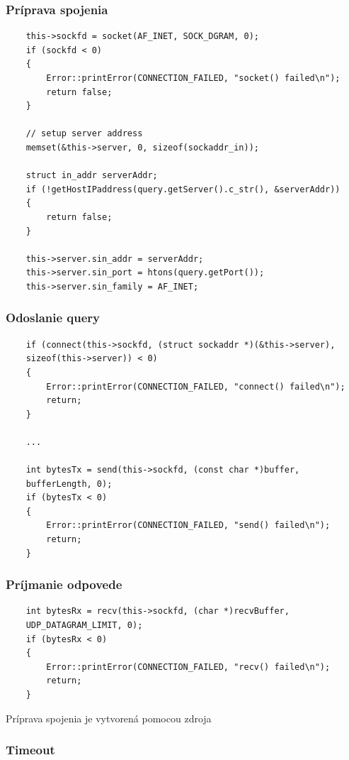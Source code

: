 \subsubsection{Príprava spojenia}
\begin{verbatim}
    this->sockfd = socket(AF_INET, SOCK_DGRAM, 0);
    if (sockfd < 0)
    {
        Error::printError(CONNECTION_FAILED, "socket() failed\n");
        return false;
    }

    // setup server address
    memset(&this->server, 0, sizeof(sockaddr_in));

    struct in_addr serverAddr;
    if (!getHostIPaddress(query.getServer().c_str(), &serverAddr))
    {
        return false;
    }

    this->server.sin_addr = serverAddr;
    this->server.sin_port = htons(query.getPort());
    this->server.sin_family = AF_INET;
\end{verbatim}

\subsubsection{Odoslanie query}
\begin{verbatim}
    if (connect(this->sockfd, (struct sockaddr *)(&this->server), 
    sizeof(this->server)) < 0)
    {
        Error::printError(CONNECTION_FAILED, "connect() failed\n");
        return;
    }
    
    ...

    int bytesTx = send(this->sockfd, (const char *)buffer, 
    bufferLength, 0);
    if (bytesTx < 0)
    {
        Error::printError(CONNECTION_FAILED, "send() failed\n");
        return;
    }
\end{verbatim}


\subsubsection{Príjmanie odpovede}

\begin{verbatim}
    int bytesRx = recv(this->sockfd, (char *)recvBuffer, 
    UDP_DATAGRAM_LIMIT, 0);
    if (bytesRx < 0)
    {
        Error::printError(CONNECTION_FAILED, "recv() failed\n");
        return;
    }
\end{verbatim}

Príprava spojenia je vytvorená pomocou zdroja \cite{UDPSockets}

\subsubsection{Timeout}


